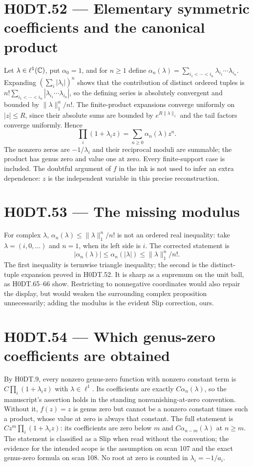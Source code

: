 \section*{H0DT.52 --- Elementary symmetric coefficients and the canonical product}
Let $\lambda\in\ell^1(\mathbb C)$, put $\alpha_0=1$, and for $n\ge1$ define
$\alpha_n(\lambda)=\sum_{i_1<\cdots<i_n}\lambda_{i_1}\cdots\lambda_{i_n}$.
Expanding $(\sum_i|\lambda_i|)^n$ shows that the contribution of distinct ordered tuples is $n!\sum_{i_1<\cdots<i_n}|\lambda_{i_1}\cdots\lambda_{i_n}|$, so the defining series is absolutely convergent and bounded by $\|\lambda\|_1^n/n!$. The finite-product expansions converge uniformly on $|z|\le R$, since their absolute sums are bounded by $e^{R\|\lambda\|_1}$ and the tail factors converge uniformly. Hence
\[
 \prod_i(1+\lambda_i z)=\sum_{n\ge0}\alpha_n(\lambda)z^n.
\]
The nonzero zeros are $-1/\lambda_i$ and their reciprocal moduli are summable; the product has genus zero and value one at zero. Every finite-support case is included. The doubtful argument of $f$ in the ink is not used to infer an extra dependence: $z$ is the independent variable in this precise reconstruction.

\section*{H0DT.53 --- The missing modulus}
For complex $\lambda$, $\alpha_n(\lambda)\le\|\lambda\|_1^n/n!$ is not an ordered real inequality: take $\lambda=(i,0,\ldots)$ and $n=1$, when its left side is $i$. The corrected statement is
\[
 |\alpha_n(\lambda)|\le\alpha_n(|\lambda|)\le\|\lambda\|_1^n/n!.
\]
The first inequality is termwise triangle inequality; the second is the distinct-tuple expansion proved in H0DT.52. It is sharp as a supremum on the unit ball, as H0DT.65--66 show. Restricting to nonnegative coordinates would also repair the display, but would weaken the surrounding complex proposition unnecessarily; adding the modulus is the evident Slip correction, ours.

\section*{H0DT.54 --- Which genus-zero coefficients are obtained}
By H0DT.9, every nonzero genus-zero function with nonzero constant term is $C\prod_i(1+\lambda_i z)$ with $\lambda\in\ell^1$. Its coefficients are exactly $C\alpha_n(\lambda)$, so the manuscript's assertion holds in the standing nonvanishing-at-zero convention. Without it, $f(z)=z$ is genus zero but cannot be a nonzero constant times such a product, whose value at zero is always that constant. The full statement is $Cz^m\prod_i(1+\lambda_i z)$: its coefficients are zero below $m$ and $C\alpha_{n-m}(\lambda)$ at $n\ge m$. The statement is classified as a Slip when read without the convention; the evidence for the intended scope is the assumption on scan 107 and the exact genus-zero formula on scan 108. No root at zero is counted in $\lambda_i=-1/a_i$.

